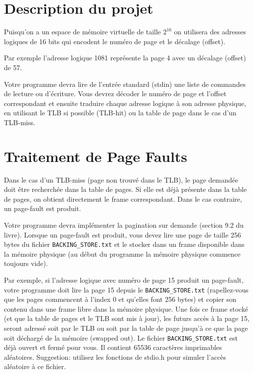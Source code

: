 \documentclass{article}
\begin{document}
\section{Description du projet}

Puisqu'on a un espace de mémoire virtuelle de taille $2^{16}$ on utilisera
des adresses logiques de 16 bits qui encodent le numéro de page et le
décalage (offset).

Par exemple l'adresse logique 1081 représente la page 4 avec un décalage
(offset) de 57.

Votre programme devra lire de l'entrée standard (stdin) une liste de
commandes de lecture ou d'écriture.  Vous devrez décoder le numéro de page
et l'offset correspondant et ensuite traduire chaque adresse logique à son
adresse physique, en utilisant le TLB si possible (TLB-hit) ou la table de
page dans le cas d'un TLB-miss.

\section{Traitement de Page Faults}

Dans le cas d'un TLB-miss (page non trouvé dans le TLB), le page demandée
doit être recherchée dans la table de pages. Si elle est déjà présente dans
la table de pages, on obtient directement le frame correspondant. Dans le
cas contraire, un page-fault est produit.

Votre programme devra implémenter la pagination sur demande (section 9.2 du
livre). Lorsque un page-fault est produit, vous devez lire une page de
taille 256 bytes du fichier \texttt{BACKING\_STORE.txt} et le stocker dans un
frame disponible dans la mémoire physique (au début du programme la mémoire
physique commence toujours vide).

Par exemple, si l'adresse logique avec numéro de page 15 produit un
page-fault, votre programme doit lire la page 15 depuis le
\texttt{BACKING\_STORE.txt} (rapellez-vous que les pages commencent
à l'index 0 et qu'elles font 256 bytes) et copier son contenu dans une frame
libre dans la mémoire physique.  Une fois ce frame stocké (et que la table
de pages et le TLB sont mis à jour), les futurs accès à la page 15, seront
adressé soit par le TLB ou soit par la table de page jusqu'à ce que la page
soit déchargé de la mémoire (swapped out). Le fichier
\texttt{BACKING\_STORE.txt} est déjà ouvert et fermé pour vous. Il contient
65536 caractères imprimables aléatoires. Suggestion: utilisez les fonctions
de stdio.h pour simuler l'accès aléatoire à ce fichier.
\end{document}
